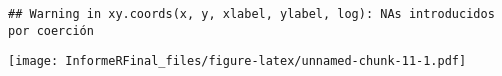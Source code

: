 \documentclass[preprint, 3p,
authoryear]{elsarticle} %
\newenvironment{Shaded}{\begin{snugshade}}{\end{snugshade}}
\newcommand{\AttributeTok}[1]{\textcolor[rgb]{0.77,0.63,0.00}{#1}}
\newcommand{\DecValTok}[1]{\textcolor[rgb]{0.00,0.00,0.81}{#1}}
\newcommand{\FunctionTok}[1]{\textcolor[rgb]{0.00,0.00,0.00}{#1}}
\newcommand{\NormalTok}[1]{#1}
\newcommand{\SpecialCharTok}[1]{\textcolor[rgb]{0.00,0.00,0.00}{#1}}
\newcommand{\StringTok}[1]{\textcolor[rgb]{0.31,0.60,0.02}{#1}}
\begin{document}
\begin{Shaded}
\end{Shaded}

\begin{verbatim}
## Warning in xy.coords(x, y, xlabel, ylabel, log): NAs introducidos por coerción
\end{verbatim}

\texttt{[image: InformeRFinal\_files/figure-latex/unnamed-chunk-11-1.pdf]}


\end{document}
